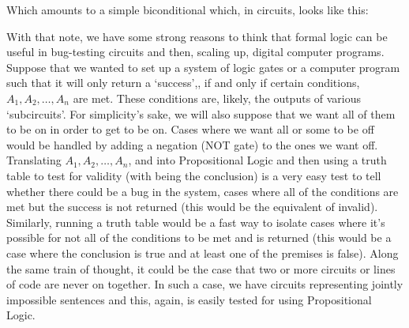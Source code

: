 Which amounts to a simple biconditional which, in circuits, looks like this:



With that note, we have some strong reasons to think that formal logic can be useful in bug-testing circuits and then, scaling up, digital computer programs. Suppose that we wanted to set up a system of logic gates or a computer program such that it will only return a `success',, if and only if certain conditions, $A_1,A_2,\ldots,A_n$ are met. These conditions are, likely, the outputs of various `subcircuits'. For simplicity's sake, we will also suppose that we want all of them to be on in order to get  to be on. Cases where we want all or some to be off would be handled by adding a negation (NOT gate) to the ones we want off. Translating $A_1,A_2,\ldots,A_n$, and  into Propositional Logic and then using a truth table to test for validity (with  being the conclusion) is a very easy test to tell whether there could be a bug in the system, cases where all of the conditions are met but the success is not returned (this would be the equivalent of invalid). Similarly, running a truth table would be a fast way to isolate cases where it's possible for not all of the conditions to be met and  is returned (this would be a case where the conclusion is true and at least one of the premises is false). Along the same train of thought, it could be the case that two or more circuits or lines of code are never on together. In such a case, we have circuits representing jointly impossible sentences and this, again, is easily tested for using Propositional Logic.    

